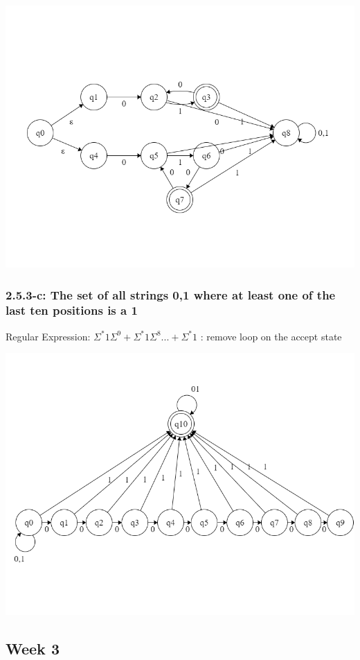 \documentclass{article}
\theoremstyle{theorem}
\theoremstyle{definition}
\theoremstyle{remark}
\begin{document}
\includegraphics[scale=0.4]{Images/2.5.3b.png}

\subsubsection{2.5.3-c: The set of all strings {0,1} where at least one of the last ten positions is a 1}
Regular Expression: $\Sigma^*1\Sigma^9+\Sigma^*1\Sigma^8...+\Sigma^*1$ : remove loop on the accept state

\includegraphics[scale=0.4]{Images/2.5.3c.png}

\subsection{Week 3}
\end{document}

